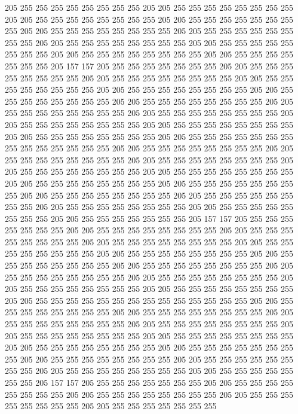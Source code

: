 205 255 255 255 255 255 255 255 255 205 205 255 255 255 255 255 255 255 255 205
205 255 255 255 255 255 255 255 255 205 205 255 255 255 255 255 255 255 255 205
205 255 255 255 255 255 255 255 255 205 205 255 255 255 255 255 255 255 255 205
205 255 255 255 255 255 255 255 255 205 205 255 255 255 255 255 255 255 255 205
205 255 255 255 255 255 255 255 255 205 205 255 255 255 255 255 255 255 205 157
157 205 255 255 255 255 255 255 255 205 205 255 255 255 255 255 255 255 255 205
205 255 255 255 255 255 255 255 255 205 205 255 255 255 255 255 255 255 255 205
205 255 255 255 255 255 255 255 255 205 205 255 255 255 255 255 255 255 255 205
205 255 255 255 255 255 255 255 255 205 205 255 255 255 255 255 255 255 255 205
205 255 255 255 255 255 255 255 255 205 205 255 255 255 255 255 255 255 255 205
205 255 255 255 255 255 255 255 255 205 205 255 255 255 255 255 255 255 255 205
205 255 255 255 255 255 255 255 255 255 255 255 255 255 255 205 205 255 255 255
255 255 255 255 255 205 205 255 255 255 255 255 255 255 255 205 205 255 255 255
255 255 255 255 255 205 205 255 255 255 255 255 255 255 255 205 205 255 255 255
255 255 255 255 255 205 205 255 255 255 255 255 255 255 255 205 205 255 255 255
255 255 255 255 255 205 205 255 255 255 255 255 255 255 255 205 205 255 255 255
255 255 255 255 255 205 205 255 255 255 255 255 255 255 255 205 205 255 255 255
255 255 255 255 255 205 205 255 255 255 255 255 255 255 205 157 157 205 255 255
255 255 255 255 255 205 205 255 255 255 255 255 255 255 255 205 205 255 255 255
255 255 255 255 255 205 205 255 255 255 255 255 255 255 255 205 205 255 255 255
255 255 255 255 255 205 205 255 255 255 255 255 255 255 255 205 205 255 255 255
255 255 255 255 255 205 205 255 255 255 255 255 255 255 255 205 205 255 255 255
255 255 255 255 255 205 205 255 255 255 255 255 255 255 255 205 205 255 255 255
255 255 255 255 255 205 205 255 255 255 255 255 255 255 255 205 205 255 255 255
255 255 255 255 255 255 255 255 255 255 255 205 205 255 255 255 255 255 255 255
255 205 205 255 255 255 255 255 255 255 255 205 205 255 255 255 255 255 255 255
255 205 205 255 255 255 255 255 255 255 255 205 205 255 255 255 255 255 255 255
255 205 205 255 255 255 255 255 255 255 255 205 205 255 255 255 255 255 255 255
255 205 205 255 255 255 255 255 255 255 255 205 205 255 255 255 255 255 255 255
255 205 205 255 255 255 255 255 255 255 255 205 205 255 255 255 255 255 255 255
255 205 205 255 255 255 255 255 255 255 205 157 157 205 255 255 255 255 255 255
255 205 205 255 255 255 255 255 255 255 255 205 205 255 255 255 255 255 255 255
255 205 205 255 255 255 255 255 255 255 255 205 205 255 255 255 255 255 255 255

